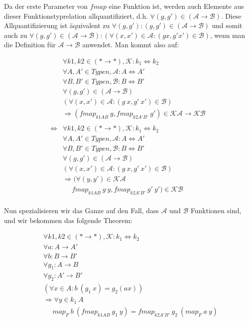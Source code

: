 \documentclass[11pt]{article} %
\begin{document}
Da der erste Parameter von $fmap$ eine Funktion ist, werden auch Elemente aus dieser Funktionstyprelation allquantifiziert, d.h.
$\forall (g, g') \in (\mathcal{A} \rightarrow \mathcal{B})$. Diese Allquantifizierung ist äquivalent zu
$\forall (g, g'): (g, g') \in (\mathcal{A} \rightarrow \mathcal{B})$ und somit auch zu $\forall (g, g') \in
(\mathcal{A} \rightarrow \mathcal{B}): (\forall (x, x') \in \mathcal{A}: (g x, g' x') \in \mathcal{B})$, wenn man die Definition für
$\mathcal{A} \rightarrow \mathcal{B}$ anwendet. Man kommt also auf:

\begin{align*}
&\forall k1, k2 \in (* \rightarrow *), \mathcal{K} : k_1 \Leftrightarrow k_2 \\
&\forall A, A' \in Typen, \mathcal{A} : A \Leftrightarrow A' \\
&\forall B, B' \in Typen, \mathcal{B} : B \Leftrightarrow B' \\
&\forall (g, g') \in (\mathcal{A} \rightarrow \mathcal{B}) \\
&(\forall (x, x') \in \mathcal{A}: (g\ x, g'\ x') \in \mathcal{B})\\
&\Rightarrow (fmap_{k1 A B}\ g, fmap_{k2 A' B'}\ g') \in \mathcal{K} \mathcal{A} \rightarrow \mathcal{K} \mathcal{B} \\
&\\
\Leftrightarrow &\forall k1, k2 \in (* \rightarrow *), \mathcal{K} : k_1 \Leftrightarrow k_2 \\
&\forall A, A' \in Typen, \mathcal{A} : A \Leftrightarrow A' \\
&\forall B, B' \in Typen, \mathcal{B} : B \Leftrightarrow B' \\
&\forall (g, g') \in (\mathcal{A} \rightarrow \mathcal{B}) \\
&(\forall (x, x') \in \mathcal{A}: (g\ x, g'\ x') \in \mathcal{B})\\
&\Rightarrow (\forall (y, y') \in \mathcal{K} \mathcal{A} \\
&\ \ \ \ \ \ fmap_{k1 A B}\ g\ y, fmap_{k2 A' B'}\ g'\ y') \in \mathcal{K} \mathcal{B}\\
\end{align*}

Nun spezialisieren wir das Ganze auf den Fall, dass $\mathcal{A}$ und $\mathcal{B}$ Funktionen sind, und wir bekommen das
folgende Theorem:

\begin{align*}
&\forall k1, k2 \in (* \rightarrow *), \mathcal{K} : k_1 \Leftrightarrow k_2 \\
&\forall a : A \rightarrow A' \\
&\forall b : B \rightarrow B' \\
&\forall g_1 : A \rightarrow B\\
&\forall g_2 : A' \rightarrow B' \\
&(\forall x \in A : b\ (g_1\ x) = g_2 (a x))\\
&\Rightarrow \forall y \in k_1\ A\\
&\ \ \ \ \ \ map_F\ b\ (fmap_{k1 A B}\ g_1\ y) = fmap_{k2 A' B'}\ g_2\ (map_F\ a\ y)
\end{align*}
\end{document}
